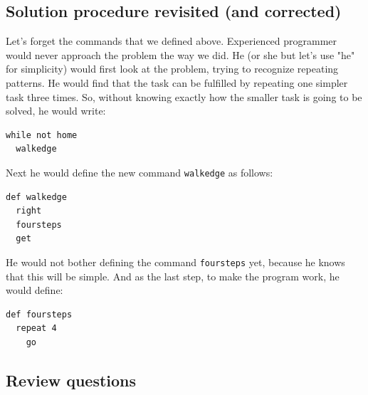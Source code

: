 \documentclass[article,A4,12pt]{llncs}
\begin{document}
{{{{\subsection{Solution procedure revisited (and corrected)}

Let's forget the commands that we defined above.
Experienced programmer would never approach the problem the way we did.
He (or she but let's use "he" for simplicity) 
would first look at the problem, trying to recognize repeating patterns. 
He would find that the task can be fulfilled by repeating one simpler task 
three times. So, without knowing exactly how the smaller task is going to 
be solved, he would write:

{\small
\begin{verbatim}
while not home
  walkedge
\end{verbatim}
}
\noindent
Next he would define the new command {\tt walkedge} as follows:

{\small
\begin{verbatim}
def walkedge
  right
  foursteps
  get
\end{verbatim}
}
\noindent
He would not bother defining the command 
{\tt foursteps} yet, because he knows that this will be 
simple. And as the last step, to make the program work, he would 
define:

{\small
\begin{verbatim}
def foursteps
  repeat 4
    go
\end{verbatim}
}

\subsection{Review questions}

}}}}
\end{document}
